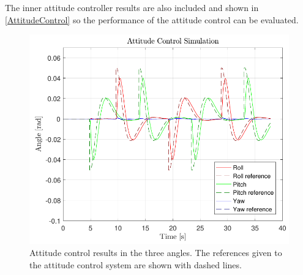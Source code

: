 The inner attitude controller results are also included and shown in \autoref{AttitudeControl} so the performance of the attitude control can be evaluated. 
\begin{figure}[H]
	\centering
	\includegraphics[width=.45\textwidth]{figures/AttitudeControl}
	\caption{Attitude control results in the three angles. The references given to the attitude control system are shown with dashed lines.}
	\label{AttitudeControl}
\end{figure}


